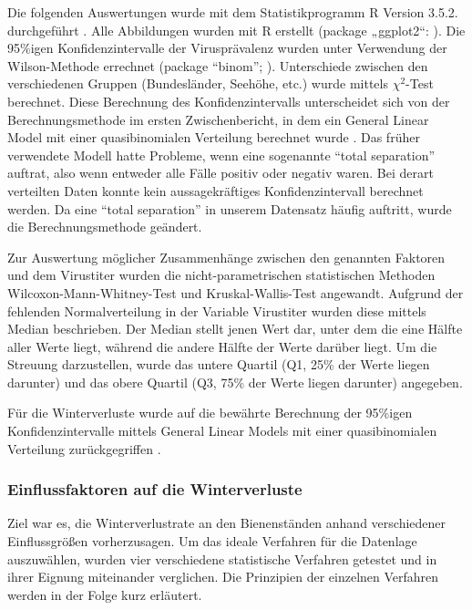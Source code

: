 Die folgenden Auswertungen wurde mit dem Statistikprogramm R Version 3.5.2. durchgeführt \citep{rcoreteam2020}. Alle Abbildungen wurden mit R erstellt (package „ggplot2“: \cite{wickham2016}). Die 95\%igen Konfidenzintervalle der Virusprävalenz wurden unter Verwendung der Wilson-Methode errechnet (package \enquote{binom}; \cite{binom2014}). Unterschiede zwischen den verschiedenen Gruppen (Bundesländer, Seehöhe, etc.) wurde mittels  $\chi^2$-Test berechnet. Diese Berechnung des Konfidenzintervalls unterscheidet sich von der Berechnungsmethode im ersten Zwischenbericht, in dem ein General Linear Model mit einer quasibinomialen Verteilung berechnet wurde \citep{vanderzee2013}. Das früher verwendete Modell hatte Probleme, wenn eine sogenannte \enquote{total separation} auftrat, also wenn entweder alle Fälle positiv oder negativ waren. Bei derart verteilten Daten konnte kein aussagekräftiges Konfidenzintervall berechnet werden. Da eine \enquote{total separation} in unserem Datensatz häufig auftritt, wurde die Berechnungsmethode geändert.

Zur Auswertung möglicher Zusammenhänge zwischen den genannten Faktoren und dem Virustiter wurden die nicht-parametrischen statistischen Methoden Wilcoxon-Mann-Whitney-Test und Kruskal-Wallis-Test angewandt. Aufgrund der fehlenden Normalverteilung in der Variable Virustiter wurden diese mittels Median beschrieben. Der Median stellt jenen Wert dar, unter dem die eine Hälfte aller Werte liegt, während die andere Hälfte der Werte darüber liegt. Um die Streuung darzustellen, wurde das untere Quartil (Q1, 25\% der Werte liegen darunter) und das obere Quartil (Q3, 75\% der Werte liegen darunter) angegeben.

Für die Winterverluste wurde auf die bewährte Berechnung der 95\%igen Konfidenzintervalle mittels General Linear Models mit einer quasibinomialen Verteilung zurückgegriffen \citep{vanderzee2013}.

\subsubsection{Einflussfaktoren auf die Winterverluste}

Ziel war es, die Winterverlustrate an den Bienenständen anhand verschiedener Einflussgrößen vorherzusagen. Um das ideale Verfahren für die Datenlage auszuwählen, wurden vier verschiedene statistische Verfahren getestet und in ihrer Eignung miteinander verglichen. Die Prinzipien der einzelnen Verfahren werden in der Folge kurz erläutert.

